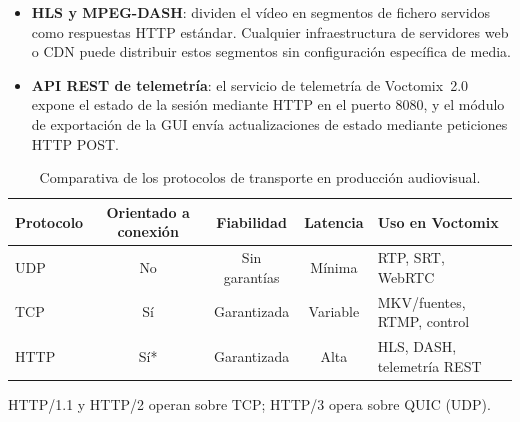 \begin{itemize}
  \item \textbf{HLS y MPEG-DASH}: dividen el vídeo en segmentos de fichero servidos
        como respuestas HTTP estándar. Cualquier infraestructura de servidores web
        o CDN puede distribuir estos segmentos sin configuración específica de media.
  \item \textbf{API REST de telemetría}: el servicio de telemetría de Voctomix~2.0
        expone el estado de la sesión mediante HTTP en el puerto 8080, y el módulo
        de exportación de la GUI envía actualizaciones de estado mediante
        peticiones HTTP POST.
\end{itemize}

\begin{table}[H]
  \centering
  \caption{Comparativa de los protocolos de transporte en producción audiovisual.}
  \label{tab:protocolos_red}
  \small
  \begin{tabular}{|l|c|c|c|l|}
    \hline
    \textbf{Protocolo} & \textbf{Orientado a conexión} & \textbf{Fiabilidad} & \textbf{Latencia} & \textbf{Uso en Voctomix} \\
    \hline
    UDP  & No  & Sin garantías & Mínima       & RTP, SRT, WebRTC \\
    TCP  & Sí  & Garantizada   & Variable     & MKV/fuentes, RTMP, control \\
    HTTP & Sí* & Garantizada   & Alta         & HLS, DASH, telemetría REST \\
    \hline
  \end{tabular}
  \begin{flushleft}
    \footnotesize *HTTP/1.1 y HTTP/2 operan sobre TCP; HTTP/3 opera sobre QUIC (UDP).
  \end{flushleft}
\end{table}
